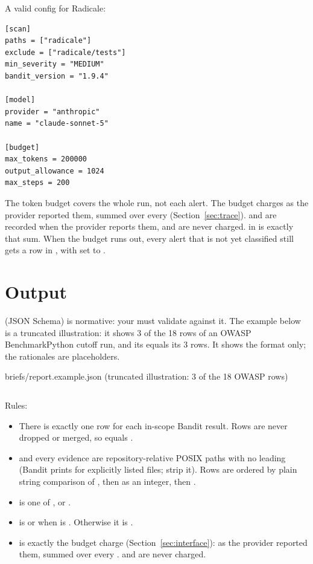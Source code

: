 \documentclass[9pt,letterpaper]{article}
\newcommand\filelisting[3]{%
  \par\smallskip\noindent\begin{minipage}{\linewidth}%
  \centerline{\small #1}\smallskip\inputminted{#2}{#3}\end{minipage}\par\smallskip}
\begin{document}
A valid config for Radicale:
\begin{verbatim}
[scan]
paths = ["radicale"]
exclude = ["radicale/tests"]
min_severity = "MEDIUM"
bandit_version = "1.9.4"

[model]
provider = "anthropic"
name = "claude-sonnet-5"

[budget]
max_tokens = 200000
output_allowance = 1024
max_steps = 200
\end{verbatim}

The token budget covers the whole run, not each alert. The budget charges
 as the provider reported them, summed over every
 (Section~\ref{sec:trace}).  and
 are recorded when the provider reports them, and are never
charged.  in  is exactly that sum.
When the budget runs out, every alert that is not yet classified still gets a
row in , with  set to .

\section{Output}\label{sec:output}

 (JSON Schema) is normative: your 
must validate against it. The example below is a truncated illustration: it shows 3 of the 18 rows of an
OWASP BenchmarkPython cutoff run, and its  equals its 3 rows.
It shows the format only; the rationales are placeholders.
\filelisting{briefs/report.example.json (truncated illustration: 3 of the 18 OWASP rows)}{json}{report.example.json}

Rules:
\begin{itemize}
\item There is exactly one row for each in-scope Bandit result. Rows are never
  dropped or merged, so  equals .
\item {} and every evidence  are repository-relative POSIX
  paths with no leading  (Bandit prints  for explicitly listed
  files; strip it). Rows are ordered by plain string comparison of ,
  then  as an integer, then .
\item {} is one of ,  or .
\item {} is  or  when  is .
  Otherwise it is .
\item {} is exactly the budget charge
  (Section~\ref{sec:interface}):  as the provider reported
  them, summed over every .  and
   are never charged.
\end{itemize}
\end{document}
